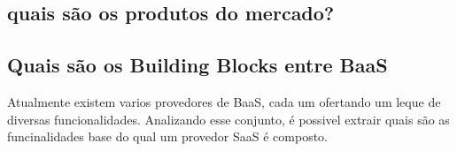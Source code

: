 
	\subsection{quais são os produtos do mercado?}

	\subsection{Quais são os Building Blocks entre BaaS}
	Atualmente existem varios provedores de BaaS, \cite{subsection_acima} cada um ofertando um leque de diversas funcionalidades. Analizando esse conjunto, é possivel extrair quais são as funcinalidades base do qual um provedor SaaS é composto.

